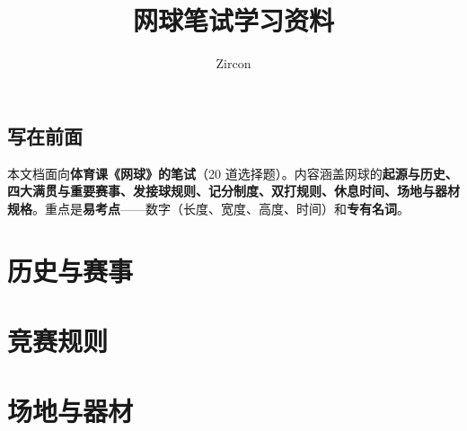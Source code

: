 \documentclass[oneside]{book}
\def\notetitle{网球笔试学习资料}
\def\noteauthor{Zircon}
\def\notedate{}
\begin{document}
\title{\heiti \LARGE \notetitle \vspace*{8\baselineskip}}
\author{\noteauthor}
\date{\notedate}

\maketitle
\newpage

\chapter*{写在前面}

本文档面向\textbf{体育课《网球》的笔试}（20 道选择题）。内容涵盖网球的\textbf{起源与历史、四大满贯与重要赛事、发接球规则、记分制度、双打规则、休息时间、场地与器材规格}。重点是\textbf{易考点}——数字（长度、宽度、高度、时间）和\textbf{专有名词}。

\setcounter{tocdepth}{1}
\tableofcontents
\newpage

\part{历史与赛事}




\part{竞赛规则}





\part{场地与器材}

\end{document}
